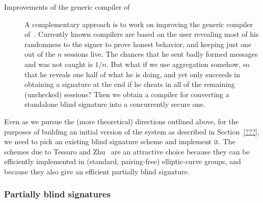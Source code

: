 \begin{description}
\item[Improvements of the generic compiler of~\cite{chllw22}]  A complementary approach is to work on improving the generic compiler of~\cite{chllw22}.  
Currently known compilers are based on the user revealing most of his randomness to the signer to prove honest behavior, and keeping just one out of the $n$ sessions live.  The chances that he sent badly formed messages and was not caught is $1/n$.  But what if we use aggregation somehow, so that he reveals one half of what he is doing, and yet only succeeds in obtaining a signature at the end if he cheats in all of the remaining (unchecked) sessions? Then we obtain a compiler for converting a standalone blind signature into a concurrently secure one.  
\end{description}

Even as we pursue the (more theoretical) directions outlined above, for the purposes of building an initial version of the system as described in Section~\ref{???}, we need to pick an existing blind signature scheme and implement it. The schemes due to Tessaro and Zhu~\cite{EC:TesZhu22} are an attractive choice because they can be efficiently implemented in (standard, pairing-free) elliptic-curve groups, and because they also give an efficient partially blind signature.


\subsubsection{Partially blind signatures}
\label{rg1:partially}

